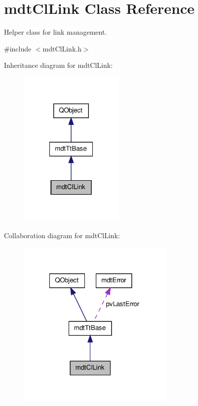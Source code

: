\hypertarget{classmdt_cl_link}{\section{mdt\-Cl\-Link Class Reference}
\label{classmdt_cl_link}
}


Helper class for link management.  




{\ttfamily \#include $<$mdt\-Cl\-Link.\-h$>$}



Inheritance diagram for mdt\-Cl\-Link\-:
\nopagebreak
\begin{figure}[H]
\begin{center}
\leavevmode
\includegraphics[width=144pt]{classmdt_cl_link__inherit__graph}
\end{center}
\end{figure}


Collaboration diagram for mdt\-Cl\-Link\-:
\nopagebreak
\begin{figure}[H]
\begin{center}
\leavevmode
\includegraphics[width=216pt]{classmdt_cl_link__coll__graph}
\end{center}
\end{figure}
